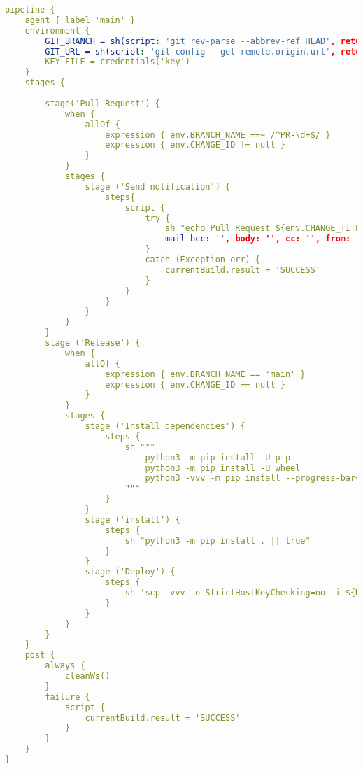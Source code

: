 \begin{lstlisting}[language=yaml, style=yamlstyle]
  pipeline {
    agent { label 'main' }
    environment {
        GIT_BRANCH = sh(script: 'git rev-parse --abbrev-ref HEAD', returnStdout: true).trim()
        GIT_URL = sh(script: 'git config --get remote.origin.url', returnStdout: true).trim()
        KEY_FILE = credentials('key')
    }
    stages {
        
        stage('Pull Request') {
            when {
                allOf {
                    expression { env.BRANCH_NAME ==~ /^PR-\d+$/ }
                    expression { env.CHANGE_ID != null }
                }
            }
            stages {
                stage ('Send notification') {
                    steps{
                        script {
                            try {
                                sh "echo Pull Request ${env.CHANGE_TITLE} created in the reportcov repository"
                                mail bcc: '', body: '', cc: '', from: '', subject: "Pull Request ${env.CHANGE_TITLE} created in the reportcov repository", to: 'victor.vanhooren@outlook.be'
                            }
                            catch (Exception err) {
                                currentBuild.result = 'SUCCESS'
                            }
                        }
                    }
                }
            }
        }
        stage ('Release') {
            when {
                allOf {
                    expression { env.BRANCH_NAME == 'main' }
                    expression { env.CHANGE_ID == null }
                }
            }
            stages {
                stage ('Install dependencies') {
                    steps {
                        sh """
                            python3 -m pip install -U pip
                            python3 -m pip install -U wheel
                            python3 -vvv -m pip install --progress-bar=off tox pytest-xdist -rci/requirements.txt --no-cache-dir --extra-index-url http://192.168.23.13:8080 --trusted-host 192.168.23.13 --user
                        """
                    }
                }
                stage ('install') {
                    steps {
                        sh "python3 -m pip install . || true"
                    }
                }
                stage ('Deploy') {
                    steps {
                        sh 'scp -vvv -o StrictHostKeyChecking=no -i ${KEY_FILE} reportcov.sh ubuntu@http://192.168.23.13:8080:~'
                    }
                }
            }
        }
    }
    post {
        always {
            cleanWs()
        }
        failure {
            script {
                currentBuild.result = 'SUCCESS'
            }
        }
    }
}
  
\end{lstlisting}

